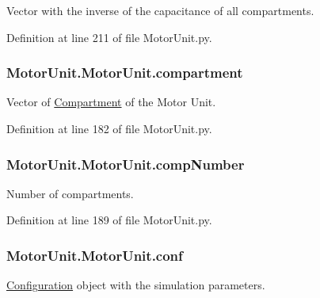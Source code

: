 Vector with the inverse of the capacitance of all compartments. 



Definition at line 211 of file Motor\-Unit.\-py.

\hypertarget{class_motor_unit_1_1_motor_unit_a6d4da7327031b3cb9c7041a4a790e524}{
\subsubsection[{compartment}]{\setlength{\rightskip}{0pt plus 5cm}Motor\-Unit.\-Motor\-Unit.\-compartment}}\label{class_motor_unit_1_1_motor_unit_a6d4da7327031b3cb9c7041a4a790e524}


Vector of \hyperlink{namespace_compartment}{Compartment} of the Motor Unit. 



Definition at line 182 of file Motor\-Unit.\-py.

\hypertarget{class_motor_unit_1_1_motor_unit_afe7281fb12c41102980b6b48d5a49713}{
\subsubsection[{comp\-Number}]{\setlength{\rightskip}{0pt plus 5cm}Motor\-Unit.\-Motor\-Unit.\-comp\-Number}}\label{class_motor_unit_1_1_motor_unit_afe7281fb12c41102980b6b48d5a49713}


Number of compartments. 



Definition at line 189 of file Motor\-Unit.\-py.

\hypertarget{class_motor_unit_1_1_motor_unit_a10539f5129881188923f3a3a164d2cba}{
\subsubsection[{conf}]{\setlength{\rightskip}{0pt plus 5cm}Motor\-Unit.\-Motor\-Unit.\-conf}}\label{class_motor_unit_1_1_motor_unit_a10539f5129881188923f3a3a164d2cba}


\hyperlink{namespace_configuration}{Configuration} object with the simulation parameters. 



